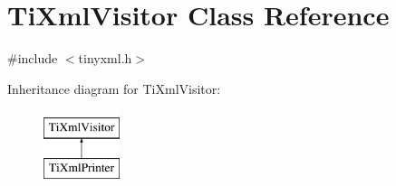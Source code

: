 \hypertarget{classTiXmlVisitor}{\section{Ti\-Xml\-Visitor Class Reference}
\label{classTiXmlVisitor}
}


{\ttfamily \#include $<$tinyxml.\-h$>$}

Inheritance diagram for Ti\-Xml\-Visitor\-:\begin{figure}[H]
\begin{center}
\leavevmode
\includegraphics[height=2.000000cm]{classTiXmlVisitor}
\end{center}
\end{figure}
